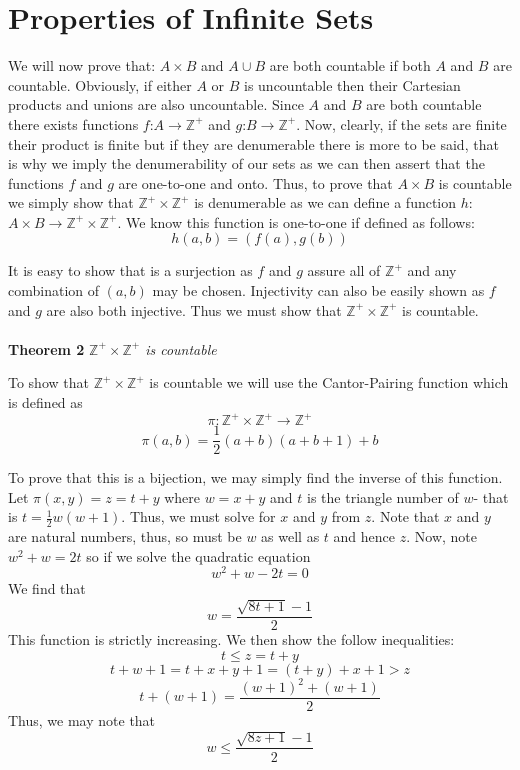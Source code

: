 \documentclass{article}
\begin{document}
\section{Properties of Infinite Sets}
\par We will now prove that: $A \times B$ and $A \cup B$ are both countable if both $A$ and $B$ are countable. Obviously, if either $A$ or $B$ is uncountable then their Cartesian products and unions are also uncountable. Since $A$ and $B$ are both countable there exists functions $f$:$A \to \mathbb{Z}^{+}$ and $g$:$B \to \mathbb{Z}^{+}$. Now, clearly, if the sets are finite their product is finite but if they are denumerable there is more to be said, that is why we imply the denumerability of our sets as we can then assert that the functions $f$ and $g$ are one-to-one and onto. Thus, to prove that $A \times B$ is countable we simply show that $\mathbb{Z}^{+} \times \mathbb{Z}^{+}$ is denumerable as we can define a function $h$:$A \times B \to \mathbb{Z}^{+} \times \mathbb{Z}^{+}$. We know this function is one-to-one if defined as follows: 
\[
h(a,b)=(f(a),g(b))
\]
\par It is easy to show that is a surjection as $f$ and $g$ assure all of $\mathbb{Z}^{+}$ and any combination of $(a,b)$ may be chosen. Injectivity can also be easily shown as $f$ and $g$ are also both injective. Thus we must show that $\mathbb{Z}^{+} \times \mathbb{Z}^{+}$ is countable.
\\
\\
\textbf{Theorem 2}
\textit{$\mathbb{Z}^{+} \times \mathbb{Z}^{+}$ is countable}
\par To show that $\mathbb{Z}^{+} \times \mathbb{Z}^{+}$ is countable we will use the Cantor-Pairing function which is defined as
\[
\pi: \mathbb{Z}^{+} \times \mathbb{Z}^{+} \to \mathbb{Z}^{+}
\]
\[
\pi(a,b)=\frac{1}{2}(a+b)(a+b+1)+b
\]
\par To prove that this is a bijection, we may simply find the inverse of this function.
Let $\pi(x,y)=z=t+y$ where $w=x+y$ and $t$ is the triangle number of $w$- that is $t=\frac{1}{2}w(w+1)$. Thus, we must solve for $x$ and $y$ from $z$. Note that $x$ and $y$ are natural numbers, thus, so must be $w$ as well as $t$ and hence $z$. Now, note $w^2+w=2t$ so if we solve the quadratic equation
\[
w^2+w-2t=0
\]
We find that 
\[
w=\frac{\sqrt{8t+1}-1}{2}
\] 
This function is strictly increasing. We then show the follow inequalities:
\[
t \leq z=t+y
\]
\[
t+w+1=t+x+y+1=(t+y)+x+1 > z
\]
\[
t+(w+1)=\frac{(w+1)^2+(w+1)}{2}
\]
Thus, we may note that 
\[
w \leq \frac{\sqrt{8z+1}-1}{2}
\]
\end{document}
